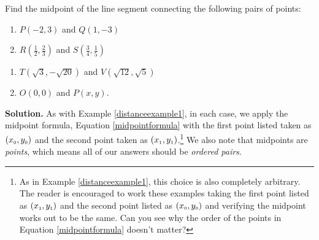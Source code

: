 \begin{ex} 

Find the midpoint of the line segment connecting the following pairs of points:  


\begin{multicols}{2}
\begin{enumerate}

\item $P(-2,3)$ and  $Q(1,-3)$ 

\item $R\left( \frac{1}{2}, \frac{2}{3}\right)$ and $S\left( \frac{3}{4}, \frac{1}{5}\right)$ 

\setcounter{HW}{\value{enumi}}
\end{enumerate}
\end{multicols}

\begin{multicols}{2}
\begin{enumerate}
\setcounter{enumi}{\value{HW}}

\item  $T(\sqrt{3}, -\sqrt{20})$ and $V(\sqrt{12}, \sqrt{5})$

\item   $O(0,0)$ and $P(x,y)$. 

\end{enumerate}
\end{multicols}

\medskip

{\bf Solution.}  As with Example \ref{distanceexample1}, in each case, we apply the midpoint formula, Equation \ref{midpointformula} with the first point listed taken as  $\left(x_{\mbox{\tiny$0$}}, y_{\mbox{\tiny$0$}}\right)$ and the second point taken as $\left(x_{\mbox{\tiny$1$}}, y_{\mbox{\tiny$1$}}\right)$.\footnote{As in Example \ref{distanceexample1}, this choice is also completely arbitrary.  The reader is encouraged to work these examples taking the first point listed as $\left(x_{\mbox{\tiny$1$}}, y_{\mbox{\tiny$1$}}\right)$ and the second point listed as $\left(x_{\mbox{\tiny$0$}}, y_{\mbox{\tiny$0$}}\right)$ and verifying the midpoint works out to be the same.  Can you see why the order of the points in Equation \ref{midpointformula} doesn't matter?}  We also note that midpoints are \textit{points}, which means all of our answers should be \textit{ordered pairs}.

\begin{enumerate}


\end{enumerate}
\end{ex}
